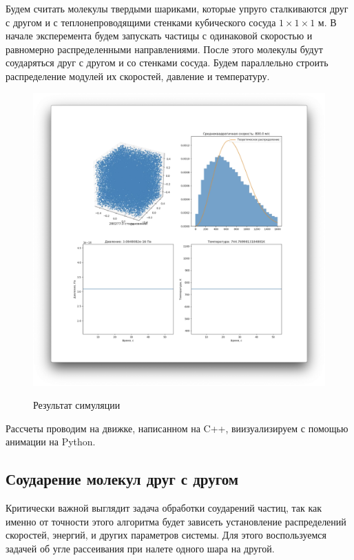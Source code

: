 \documentclass[twoside,twocolumn, 11pt]{article}
\theoremstyle{plain}
\theoremstyle{definition}
\begin{document}
\indent Будем считать молекулы твердыми шариками, которые упруго сталкиваются друг с другом и с теплонепроводящими стенками кубического сосуда $1 \times 1 \times 1$ м.
В начале эксперемента будем запускать частицы с одинаковой скоростью и равномерно распределенными направлениями. После этого молекулы будут
соударяться друг с другом и со стенками сосуда. Будем параллельно строить распределение модулей их скоростей, давление и температуру.
\begin{figure}[!h]
    {\includegraphics[width=1\linewidth]{ui.png}}
    \caption{Результат симуляции}
\end{figure}
Рассчеты проводим на движке, написанном на C++, виизуализируем с помощью анимации на Python.

\subsection{Соударение молекул друг с другом}
\indent Критически важной выглядит задача обработки соударений частиц, так как именно от точности этого алгоритма будет зависеть установление распределений скоростей, энергий, и других параметров системы.
Для этого воспользуемся задачей об угле рассеивания при налете одного шара на другой.
\end{document}
